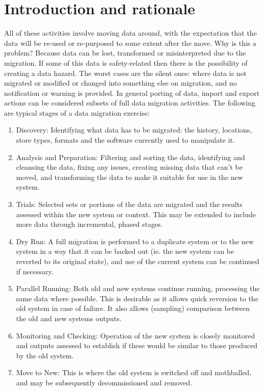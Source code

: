 \section{Introduction and rationale}\label{bkm:migrationintro}
All of these activities involve moving data around, with the expectation that the data will be re-used or re-purposed to some extent after the move. Why is this a problem? Because data can be lost, transformed or misinterpreted due to the migration. If some of this data is safety-related then there is the possibility of creating a data \gls{hazard}. The worst cases are the silent ones: where data is not migrated or modified or changed into something else on migration, and no notification or warning is provided.
In general porting of data, import and export actions can be considered subsets of full data migration activities. 
The following are typical stages of a data migration exercise:
\begin{enumerate}[label=\color{dsiwgAccentColour}\roman*)]
\item Discovery: Identifying what data has to be migrated:
the history, locations, store types, formats and the software currently used to manipulate it.
\item Analysis and Preparation:
Filtering and sorting the data, identifying and cleansing the data, fixing any issues, creating missing data that can’t be moved,
and transforming the data to make it suitable for use in the new system.
\item Trials:
Selected sets or portions of the data are migrated and the results assessed within the new system or context.
This may be extended to include more data through incremental, phased stages.
\item Dry Run:
A full migration is performed to a duplicate system or to the new system in a way that it can be backed out
(ie. the new system can be reverted to its original state), and use of the current system can be continued if necessary.
\item Parallel Running:
Both old and new systems continue running, processing the same data where possible.
This is desirable as it allows quick reversion to the old system in case of failure.
It also allows (sampling) comparison between the old and new systems outputs.
\item Monitoring and Checking:
Operation of the new system is closely monitored and outputs assessed to establish if these would be similar to those produced
by the old system.
\item Move to New:
This is where the old system is switched off and mothballed, and may be subsequently decommissioned and removed.
\end{enumerate}

